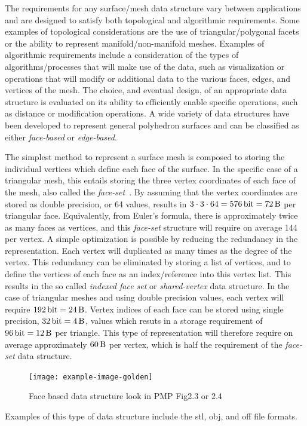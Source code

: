 The requirements for any surface/mesh data structure vary between applications and are designed to satisfy both topological and algorithmic requirements.
Some examples of topological considerations are the use of triangular/polygonal facets or the ability to represent manifold/non-manifold meshes.
Examples of algorithmic requirements include a consideration of the types of algorithms/processes that will make use of the data, such as visualization or operations that will modify or additional data to the various faces, edges, and vertices of the mesh.
The choice, and eventual design, of an appropriate data structure is evaluated on its ability to efficiently enable specific operations, such as distance or modification operations.
A wide variety of data structures have been developed to represent general polyhedron surfaces and can be classified as either \textit{face-based} or \textit{edge-based}.

The simplest method to represent a surface mesh is composed to storing the individual vertices which define each face of the surface.
In the specific case of a triangular mesh, this entails storing the three vertex coordinates of each face of the mesh, also called the \textit{face-set}~\cite{botsch2010}.
By assuming that the vertex coordinates are stored as double precision, or \SI{64}{\bit} values, results in \( 3 \cdot 3 \cdot 64 = \SI{576}{\bit} = \SI{72}{\byte}\) per triangular face.
Equivalently, from Euler's formula, there is approximately twice as many faces as vertices, and this \textit{face-set} structure will require on average \SI{144}{\byte} per vertex.
A simple optimization is possible by reducing the redundancy in the representation.
Each vertex will duplicated as many times as the degree of the vertex.
This redundancy can be eliminated by storing a list of vertices, and to define the vertices of each face as an index/reference into this vertex list.
This results in the so called \textit{indexed face set} or \textit{shared-vertex} data structure.
In the case of triangular meshes and using double precision values, each vertex will require \(\SI{192}{\bit} = \SI{24}{\byte}\).
Vertex indices of each face can be stored using single precision, \( \SI{32}{\bit} = \SI{4}{\byte}\), values which resuts in a storage requirement of \( \SI{96}{\bit} = \SI{12}{\byte}\) per triangle.
This type of representation will therefore require on average approximately \( \SI{60}{\byte} \) per vertex, which is half the requirement of the \textit{face-set} data structure.
\begin{figure}
    \centering
    \texttt{[image: example-image-golden]}
    \caption{Face based data structure look in PMP Fig2.3 or 2.4~\label{fig:face_based_data_structure}}
\end{figure}
Examples of this type of data structure include the \gls{stl}, \gls{obj}, and \gls{off} file formats.

